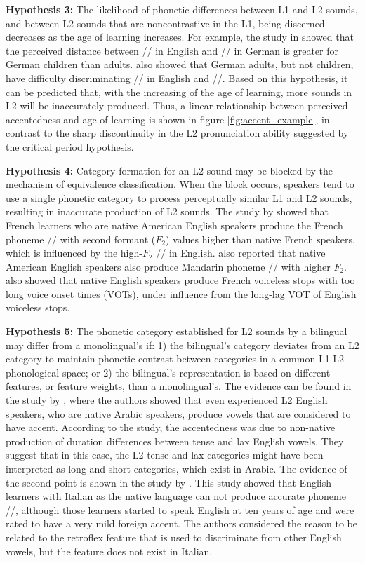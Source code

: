 \textbf{Hypothesis 3:} The likelihood of phonetic differences between L1 and L2 sounds, and between L2 sounds that are noncontrastive in the L1, being discerned decreases as the age of learning increases. For example, the study in \citep{butcher1978influence} showed that the perceived distance between // in English and /\textepsilon/ in German is greater for German children than adults. \cite{weiher1975lautwahrnehmung} also showed that German adults, but not children, have difficulty discriminating // in English and /\textepsilon/. Based on this hypothesis, it can be predicted that, with the increasing of the age of learning, more sounds in L2 will be inaccurately produced. Thus, a linear relationship between perceived accentedness and age of learning is shown in figure \ref{fig:accent_example}, in contrast to the sharp discontinuity in the L2 pronunciation ability suggested by the critical period hypothesis.

\textbf{Hypothesis 4:} Category formation for an L2 sound may be blocked by the mechanism of equivalence classification. When the block occurs, speakers tend to use a single phonetic category to process perceptually similar L1 and L2 sounds, resulting in inaccurate production of L2 sounds. The study by \cite{flege1987production} showed that French learners who are native American English speakers produce the French phoneme // with second formant ($F_2$) values higher than native French speakers, which is influenced by the high-$F_2$ // in English. \cite{chang2008phonetic} also reported that native American English speakers also produce Mandarin phoneme // with higher $F_2$. \cite{flege1987production} also showed that native English speakers produce French voiceless stops with too long voice onset times (VOTs), under influence from the long-lag VOT of English voiceless stops.

\textbf{Hypothesis 5:} The phonetic category established for L2 sounds by a bilingual may differ from a monolingual's if: 1) the bilingual's category deviates from an L2 category to maintain phonetic contrast between categories in a common L1-L2 phonological space; or 2) the bilingual's representation is based on different features, or feature weights, than a monolingual's. The evidence can be found in the study by \cite{munro1993productions}, where the authors showed that even experienced L2 English speakers, who are native Arabic speakers, produce vowels that are considered to have accent. According to the study, the accentedness was due to non-native production of duration differences between tense and lax English vowels. They suggest that in this case, the L2 tense and lax categories might have been interpreted as long and short categories, which exist in Arabic. The evidence of the second point is shown in the study by \cite{munro1996effects}. This study showed that English learners with Italian as the native language can not produce accurate phoneme /\textrhookschwa/, although those learners started to speak English at ten years of age and were rated to have a very mild foreign accent. The authors considered the reason to be related to the retroflex feature that is used to discriminate from other English vowels, but the feature does not exist in Italian.

